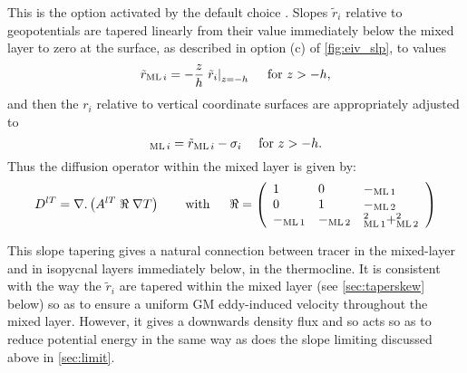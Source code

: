 \documentclass[../main/NEMO_manual]{subfiles}
\begin{document}
This is the option activated by the default choice .
Slopes $\tilde{r}_i$ relative to geopotentials are tapered linearly from their value immediately below
the mixed layer to zero at the surface, as described in option (c) of \autoref{fig:eiv_slp}, to values
\begin{equation}
  \label{eq:rmtilde}
  \tilde{r}_{\mathrm{ML}\,i} = -\frac{z}{h}\left.\tilde{r}_i\right|_{z=-h}\quad \text{ for  } z>-h,
\end{equation}
and then the $r_i$ relative to vertical coordinate surfaces are appropriately adjusted to
\[
  _{\mathrm{ML}\,i} =\tilde{r}_{\mathrm{ML}\,i} -\sigma_i \quad \text{ for  } z>-h.
\]
Thus the diffusion operator within the mixed layer is given by:
\[
  D^{lT}=\nabla {\rm {\bf .}}\left( {A^{lT}\;\Re \;\nabla T} \right) \qquad
  \mbox{with}\quad \;\;\Re =\left( {{
        \begin{array}{*{20}c}
          1 \hfill & 0 \hfill & {-\rML[1]}\hfill \\
          0 \hfill & 1 \hfill & {-\rML[2]} \hfill \\
          {-\rML[1]}\hfill &   {-\rML[2]} \hfill & {\rML[1]^2+\rML[2]^2} \hfill
        \end{array}
      }} \right)
\]

This slope tapering gives a natural connection between tracer in the mixed-layer and
in isopycnal layers immediately below, in the thermocline.
It is consistent with the way the $\tilde{r}_i$ are tapered within the mixed layer
(see \autoref{sec:taperskew} below) so as to ensure a uniform GM eddy-induced velocity throughout the mixed layer.
However, it gives a downwards density flux and so acts so as to reduce potential energy in the same way as
does the slope limiting discussed above in \autoref{sec:limit}.
 
\end{document}
